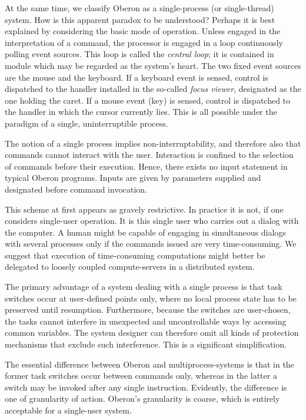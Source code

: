 At the same time, we classify Oberon as a single-process (or
single-thread) system. How is this apparent paradox to be understood?
Perhaps it is best explained by considering the basic mode of
operation. Unless engaged in the interpretation of a command, the
processor is engaged in a loop continuously polling event
sources. This loop is called the \emph{central loop}; it is contained in
module  which may be regarded as the system's heart. The two
fixed event sources are the mouse and the keyboard. If a keyboard
event is sensed, control is dispatched to the handler installed in the
so-called \emph{focus viewer}, designated as the one holding the caret. If a
mouse event (key) is sensed, control is dispatched to the handler in
which the cursor currently lies. This is all possible under the
paradigm of a single, uninterruptible process.

The notion of a single process implies non-interruptability, and
therefore also that commands cannot interact with the
user. Interaction is confined to the selection of commands before
their execution. Hence, there exists no input statement in typical
Oberon programs. Inputs are given by parameters supplied and
designated before command invocation.

This scheme at first appears as gravely restrictive. In practice it is
not, if one considers single-user operation. It is this single user
who carries out a dialog with the computer. A human might be capable
of engaging in simultaneous dialogs with several processes only if the
commands issued are very time-consuming. We suggest that execution of
time-consuming computations might better be delegated to loosely
coupled compute-servers in a distributed system.

The primary advantage of a system dealing with a single process is
that task switches occur at user-defined points only, where no local
process state has to be preserved until resumption. Furthermore,
because the switches are user-chosen, the tasks cannot interfere in
unexpected and uncontrollable ways by accessing common variables. The
system designer can therefore omit all kinds of protection mechanisms
that exclude such interference. This is a significant simplification.

The essential difference between Oberon and multiprocess-systems is
that in the former task switches occur between commands only, whereas
in the latter a switch may be invoked after any single
instruction. Evidently, the difference is one of granularity of
action. Oberon's granularity is coarse, which is entirely acceptable
for a single-user system.

